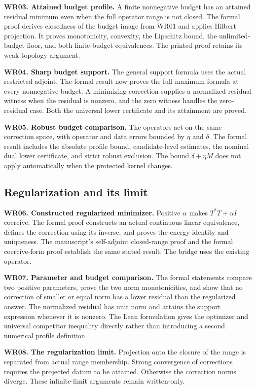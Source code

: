 \textbf{WR03. Attained budget profile.} A finite nonnegative budget has an attained residual minimum even when the full operator range is not closed. The formal proof derives closedness of the budget image from WR01 and applies Hilbert projection. It proves monotonicity, convexity, the Lipschitz bound, the unlimited-budget floor, and both finite-budget equivalences. The printed proof retains its weak topology argument.

\textbf{WR04. Sharp budget support.} The general support formula uses the actual restricted adjoint. The formal result now proves the full maximum formula at every nonnegative budget. A minimizing correction supplies a normalized residual witness when the residual is nonzero, and the zero witness handles the zero-residual case. Both the universal lower certificate and its attainment are proved.

\textbf{WR05. Robust budget comparison.} The operators act on the same correction space, with operator and data errors bounded by $\eta$ and $\delta$. The formal result includes the absolute profile bound, candidate-level estimates, the nominal dual lower certificate, and strict robust exclusion. The bound $\delta+\eta M$ does not apply automatically when the protected kernel changes.

\subsection{Regularization and its limit}
\textbf{WR06. Constructed regularized minimizer.} Positive $\alpha$ makes $T^*T+\alpha I$ coercive. The formal proof constructs an actual continuous linear equivalence, defines the correction using its inverse, and proves the energy identity and uniqueness. The manuscript's self-adjoint closed-range proof and the formal coercive-form proof establish the same stated result. The bridge uses the existing  operator.

\textbf{WR07. Parameter and budget comparison.} The formal statements compare two positive parameters, prove the two norm monotonicities, and show that no correction of smaller or equal norm has a lower residual than the regularized answer. The normalized residual has unit norm and attains the support expression whenever it is nonzero. The Lean formulation gives the optimizer and universal competitor inequality directly rather than introducing a second numerical profile definition.

\textbf{WR08. The regularization limit.} Projection onto the closure of the range is separated from actual range membership. Strong convergence of corrections requires the projected datum to be attained. Otherwise the correction norms diverge. These infinite-limit arguments remain written-only.

